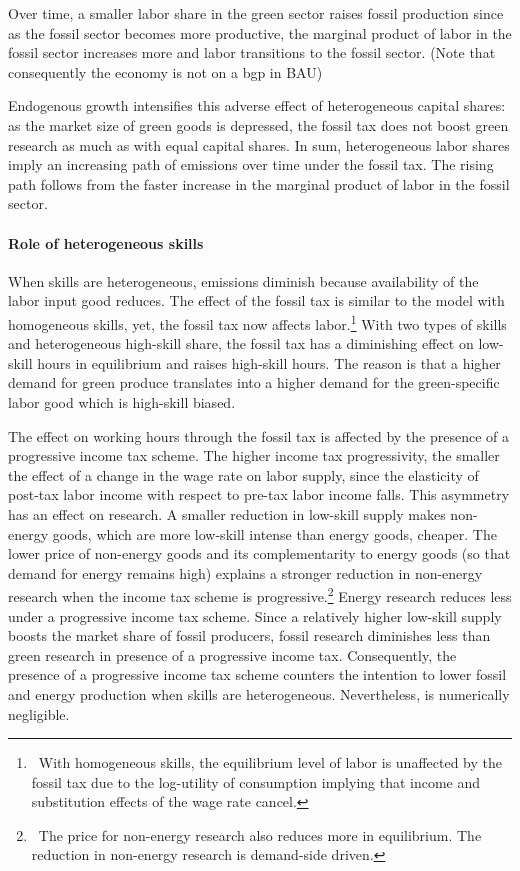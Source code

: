 Over time, a smaller labor share in the green sector raises fossil production since as the fossil sector becomes more productive, the marginal product of labor in the fossil sector increases more and labor transitions to the fossil sector.  (Note that consequently the economy is not on a bgp in BAU)

Endogenous growth intensifies this adverse effect of heterogeneous capital shares: as the market size of green goods is depressed, the fossil tax does not boost green research as much as with equal capital shares. In sum, heterogeneous labor shares imply an increasing path of emissions over time under the fossil tax. The rising path follows from the faster increase in the marginal product of labor in the fossil sector. 
 
 
 \paragraph{Role of heterogeneous skills}
 When skills are heterogeneous, emissions diminish because availability of the labor input good reduces. The effect of the fossil tax is similar to the model with homogeneous skills, yet, the fossil tax now affects labor.\footnote{\ With homogeneous skills, the equilibrium level of labor is unaffected by the fossil tax due to the log-utility of consumption implying that income and substitution effects of the wage rate cancel.}
 With two types of skills and heterogeneous high-skill share, the fossil tax has a diminishing effect on low-skill hours in equilibrium and raises high-skill hours. The reason is that a higher demand for green produce translates into a higher demand for the green-specific labor good which is high-skill biased. 
 
 The effect on working hours through the fossil tax is affected by the presence of a progressive income tax scheme. The higher income tax progressivity, the smaller the effect of a change in the wage rate on labor supply, since the elasticity of post-tax labor income with respect to pre-tax labor income falls. 
 This asymmetry has an effect on research. A smaller reduction in low-skill supply makes non-energy goods, which are more low-skill intense than energy goods, cheaper. The lower price of non-energy goods and its complementarity to energy goods (so that demand for energy remains high) explains a stronger reduction in non-energy research when the income tax scheme is progressive.\footnote{\ The price for non-energy research also reduces more in equilibrium. The reduction in non-energy research is demand-side driven.} Energy research reduces less under a progressive income tax scheme. Since a relatively higher low-skill supply boosts the market share of fossil producers, fossil research diminishes less than green research in presence of a progressive income tax. 
 Consequently, the presence of a progressive income tax scheme counters the intention to lower fossil and energy production when skills are heterogeneous. Nevertheless, is numerically negligible. 
 
